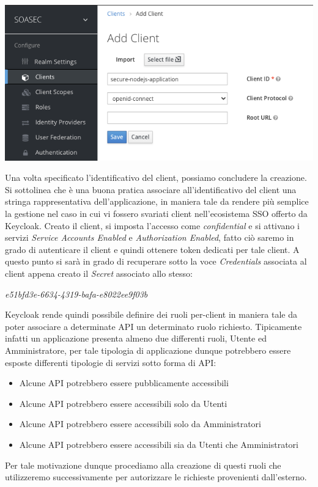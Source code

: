 \documentclass[twoside]{report}
\begin{document}
\begin{minipage}{\linewidth}
    \vspace{2mm}
    \centering
    \includegraphics[width= \linewidth]{12.png}
    \vspace{2mm}
\end{minipage}

Una volta specificato l'identificativo del client, possiamo concludere la creazione.
Si sottolinea che è una buona pratica associare all'identificativo del client una stringa rappresentativa dell'applicazione, in maniera tale da rendere più semplice la gestione nel caso in cui vi fossero svariati client nell'ecosistema SSO offerto da Keycloak.
\bigbreak
Creato il client, si imposta l'accesso come \textit{confidential} e si attivano i servizi \textit{Service Accounts Enabled} e \textit{Authorization Enabled}, fatto ciò saremo in grado di autenticare il client e quindi ottenere token dedicati per tale client.
\bigbreak
A questo punto si sarà in grado di recuperare sotto la voce \textit{Credentials} associata al client appena creato il \textit{Secret} associato allo stesso:
\begin{center}
\textit{e51bfd3e-6634-4319-bafa-e8022ee9f03b}
\end{center}

Keycloak rende quindi possibile definire dei ruoli per-client in maniera tale da poter associare a determinate API un determinato ruolo richiesto.
\bigbreak
Tipicamente infatti un applicazione presenta almeno due differenti ruoli, Utente ed Amministratore, per tale tipologia di applicazione dunque potrebbero essere esposte differenti tipologie di servizi sotto forma di API:
\begin{itemize}
\item Alcune API potrebbero essere pubblicamente accessibili
\item Alcune API potrebbero essere accessibili solo da Utenti
\item Alcune API potrebbero essere accessibili solo da Amministratori
\item Alcune API potrebbero essere accessibili sia da Utenti che Amministratori
\end{itemize}
Per tale motivazione dunque procediamo alla creazione di questi ruoli che utilizzeremo successivamente per autorizzare le richieste provenienti dall'esterno.
\end{document}
